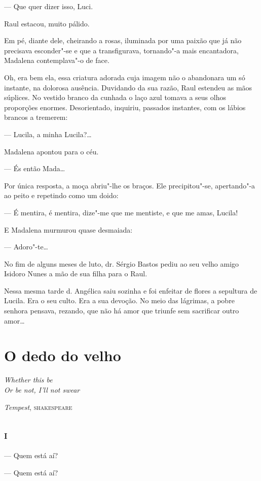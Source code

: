 --- Que quer dizer isso, Luci.

Raul estacou, muito pálido.

Em pé, diante dele, cheirando a rosas, iluminada por uma paixão que já
não precisava esconder"-se e que a transfigurava, tornando"-a mais
encantadora, Madalena contemplava"-o de face.

Oh, era bem ela, essa criatura adorada cuja imagem não o abandonara um
só instante, na dolorosa ausência. Duvidando da sua razão, Raul estendeu
as mãos súplices. No vestido branco da cunhada o laço azul tomava a seus
olhos proporções enormes. Desorientado, inquiriu, passados instantes,
com os lábios brancos a tremerem:

--- Lucila, a minha Lucila?\ldots{}

Madalena apontou para o céu.

--- És então Mada\ldots{}

Por única resposta, a moça abriu"-lhe os braços. Ele precipitou"-se,
apertando"-a ao peito e repetindo como um doido:

--- É mentira, é mentira, dize"-me que me mentiste, e que me amas,
Lucila!

E Madalena murmurou quase desmaiada:

--- Adoro"-te\ldots{}

\asterisc

No fim de alguns meses de luto, dr. Sérgio Bastos pediu ao seu velho
amigo Isidoro Nunes a mão de sua filha para o Raul.

Nessa mesma tarde d. Angélica saiu sozinha e foi enfeitar de flores a
sepultura de Lucila. Era o seu culto. Era a sua devoção. No meio das
lágrimas, a pobre senhora pensava, rezando, que não há amor que triunfe
sem sacrificar outro amor\ldots{}

\chapter{O dedo do velho}

\epigraph{\textit{Whether this be}\\
\textit{Or be not, I'll not swear}}{\emph{Tempest}, \textsc{shakespeare}}

\section*{\textsc{i}}

--- Quem está aí?

--- Quem está aí?

